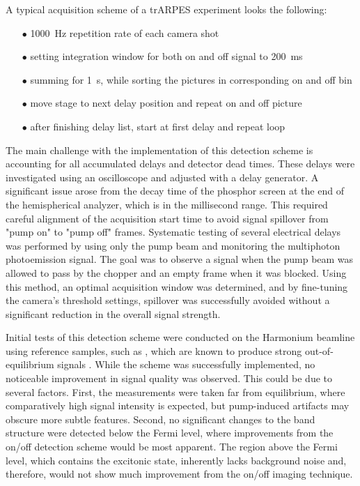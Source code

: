 A typical acquisition scheme of a trARPES experiment looks the following:
\begin{itemize}[topsep=-0.5em]
	\setlength\itemsep{-0.5em}
	\item [$\bullet$] \qty{1000}{\hertz} repetition rate of each camera shot
	\item [$\bullet$] setting integration window for both on and off signal to \qty{200}{\milli\second}
	\item [$\bullet$] summing for \qty{1}{\second}, while sorting the pictures in corresponding on and off bin
	\item [$\bullet$] move stage to next delay position and repeat on and off picture
	\item [$\bullet$] after finishing delay list, start at first delay and repeat loop
\end{itemize}
The main challenge with the implementation of this detection scheme is accounting for all accumulated delays and detector dead times.
These delays were investigated using an oscilloscope and adjusted with a delay generator.
A significant issue arose from the decay time of the phosphor screen at the end of the hemispherical analyzer, which is in the millisecond range.
This required careful alignment of the acquisition start time to avoid signal spillover from "pump on" to "pump off" frames.
Systematic testing of several electrical delays was performed by using only the pump beam and monitoring the multiphoton photoemission signal.
The goal was to observe a signal when the pump beam was allowed to pass by the chopper and an empty frame when it was blocked.
Using this method, an optimal acquisition window was determined, and by fine-tuning the camera's threshold settings, spillover was successfully avoided without a significant reduction in the overall signal strength.

Initial tests of this detection scheme were conducted on the Harmonium beamline using reference samples, such as , which are known to produce strong out-of-equilibrium signals \cite{puppin_excited-state_2022}.
While the scheme was successfully implemented, no noticeable improvement in signal quality was observed.
This could be due to several factors.
First, the measurements were taken far from equilibrium, where comparatively high signal intensity is expected, but pump-induced artifacts may obscure more subtle features.
Second, no significant changes to the band structure were detected below the Fermi level, where improvements from the on/off detection scheme would be most apparent.
The region above the Fermi level, which contains the excitonic state, inherently lacks background noise and, therefore, would not show much improvement from the on/off imaging technique.

